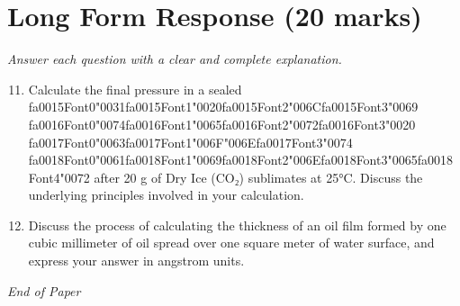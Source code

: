 \documentclass[12pt]{article}
\begin{document}
\section*{Long Form Response (20 marks)}
\textit{Answer each question with a clear and complete explanation.}
\begin{enumerate}[label=\arabic*.]
\setcounter{enumi}{10}
\item Calculate the final pressure in a sealed {\csname fa0015Font0\endcsname\char"0031}{\csname fa0015Font1\endcsname\char"0020}{\csname fa0015Font2\endcsname\char"006C}{\csname fa0015Font3\endcsname\char"0069} {\csname fa0016Font0\endcsname\char"0074}{\csname fa0016Font1\endcsname\char"0065}{\csname fa0016Font2\endcsname\char"0072}{\csname fa0016Font3\endcsname\char"0020} {\csname fa0017Font0\endcsname\char"0063}{\csname fa0017Font1\endcsname\char"006F}{\char"006E}{\csname fa0017Font3\endcsname\char"0074} {\csname fa0018Font0\endcsname\char"0061}{\csname fa0018Font1\endcsname\char"0069}{\csname fa0018Font2\endcsname\char"006E}{\csname fa0018Font3\endcsname\char"0065}{\csname fa0018Font4\endcsname\char"0072} after 20 g of Dry Ice
(CO₂) sublimates at 25°C. Discuss the underlying principles involved in your calculation.
\item Discuss the process of calculating the thickness of an oil film formed by one cubic
millimeter of oil spread over one square meter of water surface, and express your answer
in angstrom units.
\end{enumerate}

\vfill
\noindent\textit{End of Paper}
\end{document}
